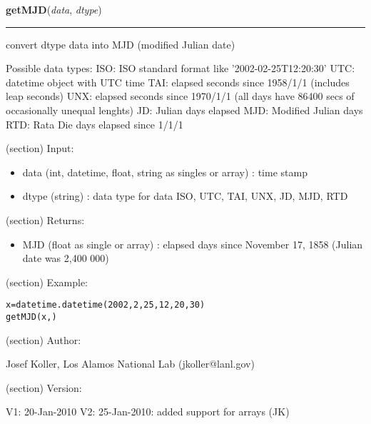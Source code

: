     \label{spacepy:ticktock:getMJD}

    \vspace{0.5ex}

\hspace{.8\funcindent}\begin{boxedminipage}{\funcwidth}

    \raggedright \textbf{getMJD}(\textit{data}, \textit{dtype})

    \vspace{-1.5ex}

    \rule{\textwidth}{0.5\fboxrule}
\setlength{\parskip}{2ex}
    convert dtype data into MJD (modified Julian date)

    Possible data types: ISO: ISO standard format like 
    '2002-02-25T12:20:30' UTC: datetime object with UTC time TAI: elapsed 
    seconds since 1958/1/1 (includes leap seconds) UNX: elapsed seconds 
    since 1970/1/1 (all days have 86400 secs of occasionally unequal 
    lenghts) JD: Julian days elapsed MJD: Modified Julian days RTD: Rata 
    Die days elapsed since 1/1/1

    (section) Input:

      \begin{itemize}
      \setlength{\parskip}{0.6ex}
        \item data (int, datetime, float, string as singles or array) : time 
          stamp

        \item dtype (string) : data type for data ISO, UTC, TAI, UNX, JD, MJD, 
          RTD

      \end{itemize}

    (section) Returns:

      \begin{itemize}
      \setlength{\parskip}{0.6ex}
        \item MJD (float as single or array) : elapsed days since November 17, 
          1858 (Julian date was 2,400 000)

      \end{itemize}

    (section) Example:

\begin{alltt}
\pysrcprompt{{\textgreater}{\textgreater}{\textgreater} }x=datetime.datetime(2002,2,25,12,20,30)
\pysrcprompt{{\textgreater}{\textgreater}{\textgreater} }getMJD(x, )
\end{alltt}
    (section) Author:

      Josef Koller, Los Alamos National Lab (jkoller@lanl.gov)

    (section) Version:

      V1: 20-Jan-2010 V2: 25-Jan-2010: added support for arrays (JK)

\setlength{\parskip}{1ex}
    \end{boxedminipage}

